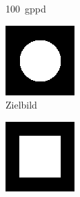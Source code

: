 \begin{figure}[ht]
\begin{subfigure}{0.32\linewidth}
    \caption{\SI{100}{gppd}}
  \end{subfigure}
  \vfill
  \begin{subfigure}{0.32\linewidth}
    \centering
    \includegraphics[width=\linewidth]{images/A4_fixed.png}
    \caption{Zielbild}
  \end{subfigure}
  \hfill
  \begin{subfigure}{0.32\linewidth}
    \centering
    \includegraphics[width=\linewidth]{images/A4_moving.png}

\end{subfigure}
\end{figure}

